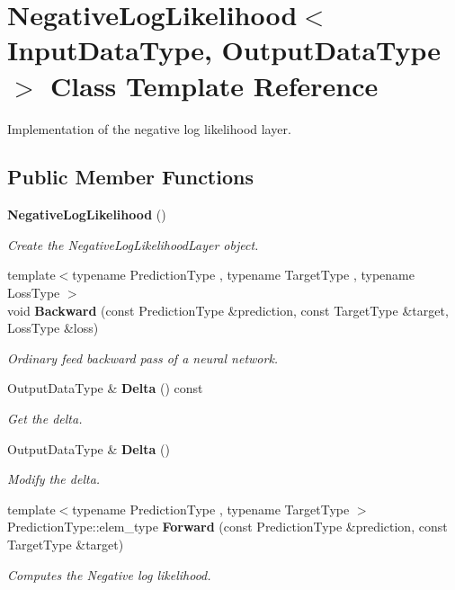 \section{Negative\+Log\+Likelihood$<$ Input\+Data\+Type, Output\+Data\+Type $>$ Class Template Reference}
\label{classmlpack_1_1ann_1_1NegativeLogLikelihood}


Implementation of the negative log likelihood layer.  


\subsection*{Public Member Functions}
\begin{DoxyCompactItemize}
\item 
\textbf{ Negative\+Log\+Likelihood} ()
\begin{DoxyCompactList}\small\item\em Create the Negative\+Log\+Likelihood\+Layer object. \end{DoxyCompactList}\item 
{\footnotesize template$<$typename Prediction\+Type , typename Target\+Type , typename Loss\+Type $>$ }\\void \textbf{ Backward} (const Prediction\+Type \&prediction, const Target\+Type \&target, Loss\+Type \&loss)
\begin{DoxyCompactList}\small\item\em Ordinary feed backward pass of a neural network. \end{DoxyCompactList}\item 
Output\+Data\+Type \& \textbf{ Delta} () const
\begin{DoxyCompactList}\small\item\em Get the delta. \end{DoxyCompactList}\item 
Output\+Data\+Type \& \textbf{ Delta} ()
\begin{DoxyCompactList}\small\item\em Modify the delta. \end{DoxyCompactList}\item 
{\footnotesize template$<$typename Prediction\+Type , typename Target\+Type $>$ }\\Prediction\+Type\+::elem\+\_\+type \textbf{ Forward} (const Prediction\+Type \&prediction, const Target\+Type \&target)
\begin{DoxyCompactList}\small\item\em Computes the Negative log likelihood. \end{DoxyCompactList}\item 

\end{DoxyCompactItemize}
